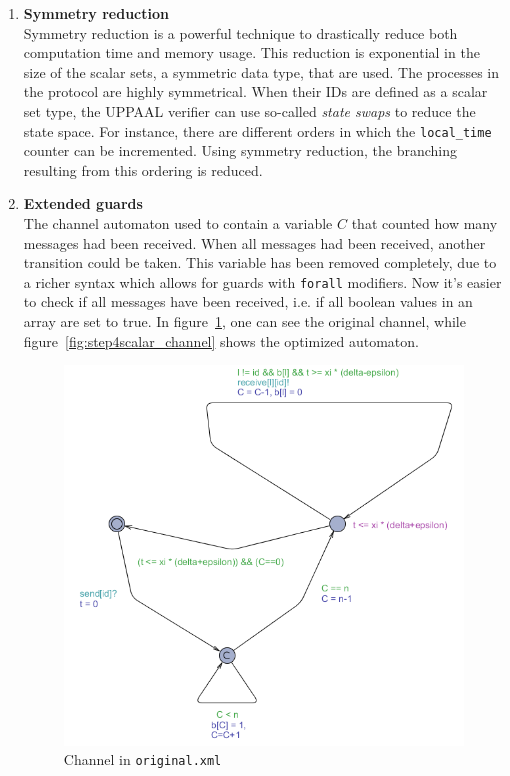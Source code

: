 \documentclass[a4paper,10pt]{article}
\newcommand{\UPPAAL}{UPPAAL\xspace}
\begin{document}
\begin{enumerate}
\item \textbf{Symmetry reduction} \\
	Symmetry reduction \cite{Hendriks2004Adding} is a powerful technique to drastically reduce both computation time and memory usage. This reduction is exponential in the size of the scalar sets, a symmetric data type, that are used. The processes in the protocol are highly symmetrical. When their IDs are defined as a scalar set type, the \UPPAAL verifier can use so-called \textit{state swaps} to reduce the state space. For instance, there are different orders in which the \texttt{local\_time} counter can be incremented. Using symmetry reduction, the branching resulting from this ordering is reduced.

\item \textbf{Extended guards} \\
	The channel automaton used to contain a variable \(C\) that counted how many messages had been received. When all messages had been received, another transition could be taken. This variable has been removed completely, due to a richer syntax which allows for guards with \texttt{forall} modifiers. Now it's easier to check if all messages have been received, i.e. if all boolean values in an array are set to true. In figure~\ref{fig:original_channel}, one can see the original channel, while figure~\ref{fig:step4scalar_channel} shows the optimized automaton.

\begin{figure}[!h]
\includegraphics[scale=0.7]{original_channel}
\caption{Channel in \texttt{original.xml}\label{fig:original_channel}}
\end{figure}


\end{enumerate}
\end{document}
